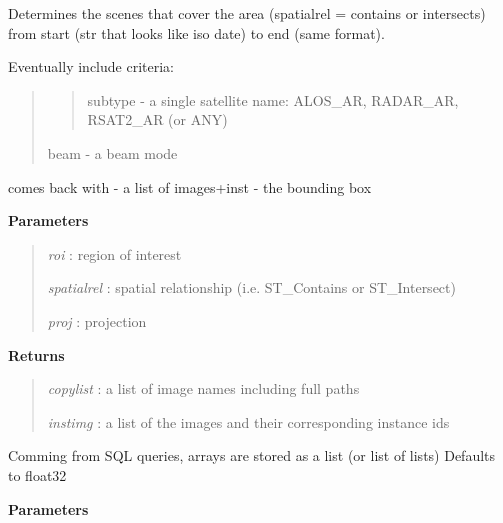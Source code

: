 \documentclass[letterpaper,10pt,english]{sphinxmanual}
\begin{document}
\begin{fulllineitems}
\begin{fulllineitems}
\end{fulllineitems}


\begin{fulllineitems}
\label{code:Database.Database.qrySelectFromLocal}
Determines the scenes that cover the area (spatialrel = contains or intersects)
from start (str that looks like iso date) to end (same format).

Eventually include criteria:
\begin{quote}
\begin{quote}

subtype - a single satellite name: ALOS\_AR, RADAR\_AR, RSAT2\_AR (or ANY)
\end{quote}

beam - a beam mode
\end{quote}

comes back with - a list of images+inst - the bounding box

\textbf{Parameters}
\begin{quote}

\emph{roi}        : region of interest

\emph{spatialrel} : spatial relationship (i.e. ST\_Contains or ST\_Intersect)

\emph{proj}       : projection
\end{quote}

\textbf{Returns}
\begin{quote}

\emph{copylist}   : a list of image names including full paths

\emph{instimg}    : a list of the images and their corresponding instance ids
\end{quote}

\end{fulllineitems}


\begin{fulllineitems}
\label{code:Database.Database.sql2numpy}
Comming from SQL queries, arrays are stored as a list (or list of lists)
Defaults to float32

\textbf{Parameters}
\begin{quote}


\end{quote}
\end{fulllineitems}
\end{fulllineitems}
\end{document}
